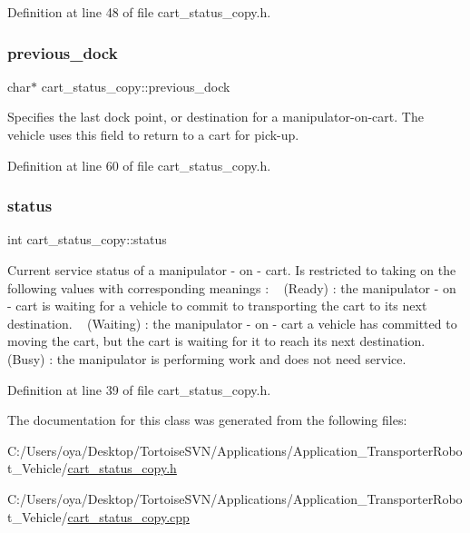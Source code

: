 Definition at line 48 of file cart\+\_\+status\+\_\+copy.\+h.

\mbox{\label{classcart__status__copy_a77d6208ab0579618165d77e56a6b8f01}} 
\subsubsection{\texorpdfstring{previous\+\_\+dock}{previous\_dock}}
{\footnotesize\ttfamily char$\ast$ cart\+\_\+status\+\_\+copy\+::previous\+\_\+dock\hspace{0.3cm}{\ttfamily [private]}}

Specifies the last dock point, or destination for a manipulator-\/on-\/cart. The vehicle uses this field to return to a cart for pick-\/up. 

Definition at line 60 of file cart\+\_\+status\+\_\+copy.\+h.

\mbox{\label{classcart__status__copy_a00f9d96ff04b8975c69a263ff15708ec}} 
\subsubsection{\texorpdfstring{status}{status}}
{\footnotesize\ttfamily int cart\+\_\+status\+\_\+copy\+::status\hspace{0.3cm}{\ttfamily [private]}}

Current service status of a manipulator -\/ on -\/ cart. Is restricted to taking on the following values with corresponding meanings \+: ~ (Ready) \+: the manipulator -\/ on -\/ cart is waiting for a vehicle to commit to transporting the cart to its next destination. ~ (Waiting) \+: the manipulator -\/ on -\/ cart a vehicle has committed to moving the cart, but the cart is waiting for it to reach its next destination. ~ (Busy) \+: the manipulator is performing work and does not need service. 

Definition at line 39 of file cart\+\_\+status\+\_\+copy.\+h.



The documentation for this class was generated from the following files\+:\begin{DoxyCompactItemize}
\item 
C\+:/\+Users/oya/\+Desktop/\+Tortoise\+S\+V\+N/\+Applications/\+Application\+\_\+\+Transporter\+Robot\+\_\+\+Vehicle/\mbox{\hyperlink{cart__status__copy_8h}{cart\+\_\+status\+\_\+copy.\+h}}\item 
C\+:/\+Users/oya/\+Desktop/\+Tortoise\+S\+V\+N/\+Applications/\+Application\+\_\+\+Transporter\+Robot\+\_\+\+Vehicle/\mbox{\hyperlink{cart__status__copy_8cpp}{cart\+\_\+status\+\_\+copy.\+cpp}}\end{DoxyCompactItemize}
